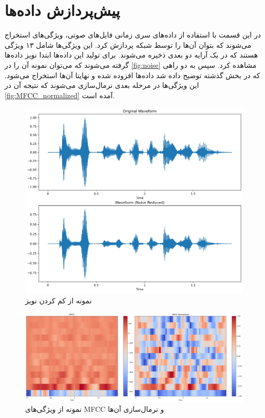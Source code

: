 \documentclass[11pt]{article}
\begin{document}
	\section{پیش‌پردازش داده‌ها}
	در این قسمت با استفاده از داده‌های سری زمانی فایل‌های صوتی، ویژگی‌های 
	استخراج می‌شوند که بتوان آن‌ها را توسط شبکه پردازش کرد. این ویژگی‌ها شامل ۱۳ ویژگی هستند که در یک آرایه دو بعدی ذخیره می‌شوند. برای تولید این داده‌ها ابتدا نویز داده‌ها گرفته می‌شوند که می‌توان نمونه آن را در 
	\autoref{fig:noise}
	مشاهده کرد. سپس به دو راهی که در بخش گذشته توضیح داده شد داده‌ها افزوده شده و نهایتا 
	آن‌ها استخراج می‌شود. این ویژگی‌ها در مرحله بعدی نرمال‌سازی می‌شوند که نتیجه آن در 
	\autoref{fig:MFCC_normalized}
	آمده است.
	\begin{figure}[!h]
		\centerline{\includegraphics[width=0.8\linewidth]{../noise_ex.png}}
		\caption{نمونه از کم کردن نویز}
		\label{fig:noise}
	\end{figure}
	\begin{figure}[!h]
		\centerline{\includegraphics[width=1\linewidth]{../MFCC_ex.png}}
		\caption{نمونه از ویژگی‌های MFCC و نرمال‌سازی آن‌ها}
		\label{fig:MFCC_normalized}
	\end{figure}\\
	\clearpage
\end{document}
